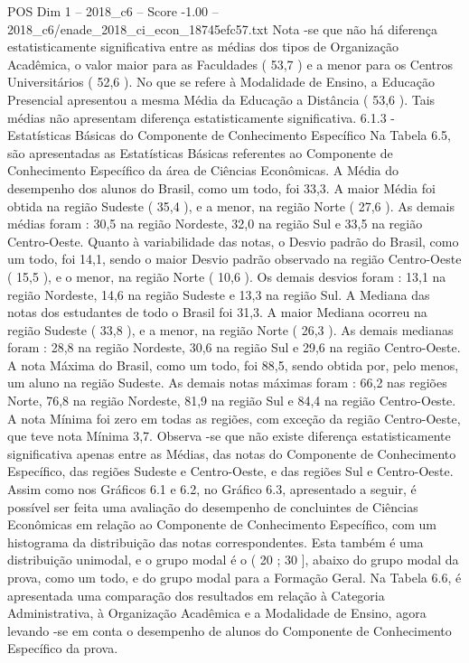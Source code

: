 \begin{textsample}{POS Dim 1 – 2018\_c6 – Score -1.00 – 2018\_c6/enade\_2018\_ci\_econ\_18745efc57.txt}
Nota -se que não há diferença estatisticamente significativa entre as médias dos tipos de Organização Acadêmica, o valor maior para as Faculdades ( 53,7 ) e a menor para os Centros Universitários ( 52,6 ).
No que se refere à Modalidade de Ensino, a Educação Presencial apresentou a mesma Média da Educação a Distância ( 53,6 ).
Tais médias não apresentam diferença estatisticamente significativa. 6.1.3 - Estatísticas Básicas do Componente de Conhecimento Específico Na Tabela 6.5, são apresentadas as Estatísticas Básicas referentes ao Componente de Conhecimento Específico da área de Ciências Econômicas.
A Média do desempenho dos alunos do Brasil, como um todo, foi 33,3.
A maior Média foi obtida na região Sudeste ( 35,4 ), e a menor, na região Norte ( 27,6 ).
As demais médias foram : 30,5 na região Nordeste, 32,0 na região Sul e 33,5 na região Centro-Oeste.
Quanto à variabilidade das notas, o Desvio padrão do Brasil, como um todo, foi 14,1, sendo o maior Desvio padrão observado na região Centro-Oeste ( 15,5 ), e o menor, na região Norte ( 10,6 ).
Os demais desvios foram : 13,1 na região Nordeste, 14,6 na região Sudeste e 13,3 na região Sul.
A Mediana das notas dos estudantes de todo o Brasil foi 31,3.
A maior Mediana ocorreu na região Sudeste ( 33,8 ), e a menor, na região Norte ( 26,3 ).
As demais medianas foram : 28,8 na região Nordeste, 30,6 na região Sul e 29,6 na região Centro-Oeste.
A nota Máxima do Brasil, como um todo, foi 88,5, sendo obtida por, pelo menos, um aluno na região Sudeste.
As demais notas máximas foram : 66,2 nas regiões Norte, 76,8 na região Nordeste, 81,9 na região Sul e 84,4 na região Centro-Oeste.
A nota Mínima foi zero em todas as regiões, com exceção da região Centro-Oeste, que teve nota Mínima 3,7.
Observa -se que não existe diferença estatisticamente significativa apenas entre as Médias, das notas do Componente de Conhecimento Específico, das regiões Sudeste e Centro-Oeste, e das regiões Sul e Centro-Oeste.
Assim como nos Gráficos 6.1 e 6.2, no Gráfico 6.3, apresentado a seguir, é possível ser feita uma avaliação do desempenho de concluintes de Ciências Econômicas em relação ao Componente de Conhecimento Específico, com um histograma da distribuição das notas correspondentes.
Esta também é uma distribuição unimodal, e o grupo modal é o ( 20 ; 30 ], abaixo do grupo modal da prova, como um todo, e do grupo modal para a Formação Geral.
Na Tabela 6.6, é apresentada uma comparação dos resultados em relação à Categoria Administrativa, à Organização Acadêmica e a Modalidade de Ensino, agora levando -se em conta o desempenho de alunos do Componente de Conhecimento Específico da prova.

\end{textsample}
